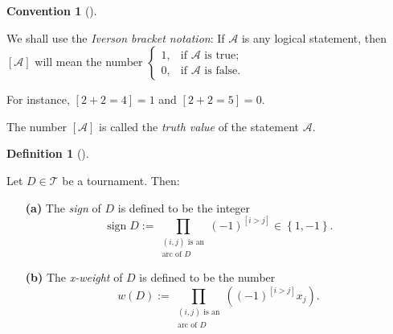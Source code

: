 \documentclass[numbers=enddot,12pt,final,onecolumn,notitlepage]{scrartcl}%
\numberwithin{exer}{subsection}
\theoremstyle{definition}
\newtheorem{defi}[theo]{Definition}
\newenvironment{definition}[1][]
{\begin{defi}[#1]\begin{leftbar}}
{\end{leftbar}\end{defi}}
\newtheorem{conv}[theo]{Convention}
\newenvironment{convention}[1][]
{\begin{conv}[#1]\begin{leftbar}}
{\end{leftbar}\end{conv}}
\let\prodnonlimits\prod
\renewcommand{\prod}{\prodnonlimits\limits}
\begin{document}
\begin{convention}
We shall use the \emph{Iverson bracket notation}: If $\mathcal{A}$ is any
logical statement, then $\left[  \mathcal{A}\right]  $ will mean the number $%
\begin{cases}
1, & \text{if }\mathcal{A}\text{ is true;}\\
0, & \text{if }\mathcal{A}\text{ is false.}%
\end{cases}
$

For instance, $\left[  2+2=4\right]  =1$ and $\left[  2+2=5\right]  =0$.

The number $\left[  \mathcal{A}\right]  $ is called the \emph{truth value} of
the statement $\mathcal{A}$.
\end{convention}

\begin{definition}
\label{def.tour1n.wD}Let $D\in\mathcal{T}$ be a tournament. Then:

\begin{enumerate}
\item[\textbf{(a)}] The \emph{sign} of $D$ is defined to be the integer%
\begin{equation}
\operatorname*{sign}D:=\prod_{\substack{\left(  i,j\right)  \text{ is
an}\\\text{arc of }D}}\left(  -1\right)  ^{\left[  i>j\right]  }\in\left\{
1,-1\right\}  .\label{eq.def.tour1n.wD.sign}%
\end{equation}


\item[\textbf{(b)}] The \emph{x-weight} of $D$ is defined to be the number%
\begin{equation}
w\left(  D\right)  :=\prod_{\substack{\left(  i,j\right)  \text{ is
an}\\\text{arc of }D}}\left(  \left(  -1\right)  ^{\left[  i>j\right]  }%
x_{j}\right)  . \label{eq.def.tour1n.wD.eq}%
\end{equation}

\end{enumerate}
\end{definition}
\end{document}
